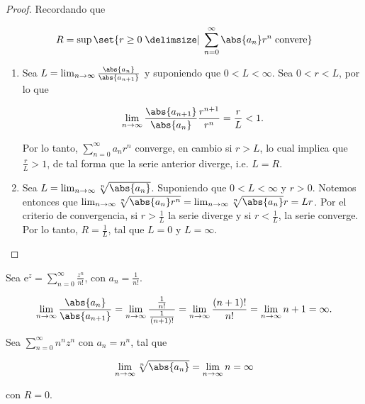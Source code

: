 \documentclass[../main.tex]{subfiles}
\begin{document}
\begin{proof}
    Recordando que

    \begin{equation*}
        R = \sup\set{r \geq 0 \given \sum_{n = 0}^{\infty}\abs{a_{n}}r^{n}\;
        \text{convere}}
    \end{equation*}

    \begin{enumerate}
        \item Sea \(L = \lim_{n \to \infty} \tfrac{\abs{a_{n}}}{\abs{a_{n + 1}}}\) y
            suponiendo que \(0 < L < \infty\).
            Sea \(0 < r < L\), por lo que

            \begin{equation*}
                \lim_{n \to \infty} \dfrac{\abs{a_{n +
                1}}}{\abs{a_{n}}}\dfrac{r^{n + 1}}{r^{n}} =
                \dfrac{r}{L} < 1.
            \end{equation*}

            Por lo tanto, \(\sum_{n = 0}^{\infty}a_{n}r^{n}\) converge, en cambio si \(r
            > L\), lo cual implica que \(\tfrac{r}{L} > 1\), de tal forma que la serie
            anterior diverge, i.e. \(L = R\).

        \item Sea \(L = \lim_{n \to \infty} \sqrt[n]{\abs{a_{n}}}\). Suponiendo que
            \(0 < L < \infty\) y \(r > 0\). Notemos entonces que \(\lim_{n \to \infty}
                \sqrt[n]{\abs{a_{n}}r^{n}} = \lim_{n \to \infty}
            \sqrt[n]{\abs{a_{n}}}r = Lr\).
            Por el criterio de convergencia, si \(r > \tfrac{1}{L}\) la serie diverge y
            si \(r < \tfrac{1}{L}\), la serie converge.
            Por lo tanto, \(R = \tfrac{1}{L}\), tal que \(L = 0\) y \(L = \infty\).
    \end{enumerate}
\end{proof}

\begin{example}
    Sea \(\mathrm{e}^{z} = \sum_{n = 0}^{\infty} \tfrac{z^{n}}{n!}\), con \(a_{n} =
    \tfrac{1}{n!}\).

    \begin{equation*}
        \lim_{n \to \infty} \dfrac{\abs{a_{n}}}{\abs{a_{n + 1}}} = \lim_{n \to \infty}
        \dfrac{\tfrac{1}{n!}}{\tfrac{1}{(n + 1)!}} = \lim_{n \to \infty}
        \dfrac{(n + 1)!}{n!}
        = \lim_{n \to \infty} n + 1 = \infty.
    \end{equation*}

    Sea \(\sum_{n = 0}^{\infty}n^{n}z^{n}\) con \(a_{n} = n^{n}\), tal que

    \begin{equation*}
        \lim_{n \to \infty} \sqrt[n]{\abs{a_{n}}} = \lim_{n \to \infty} n = \infty
    \end{equation*}

    con \(R = 0\).
\end{example}
\end{document}
